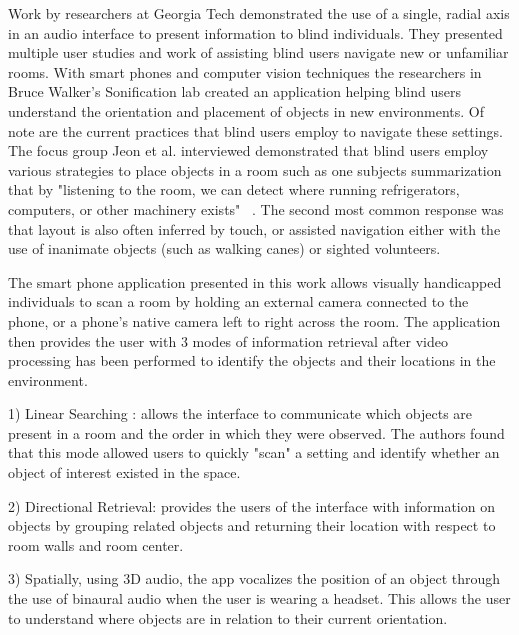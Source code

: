 Work by researchers at Georgia Tech demonstrated the use of a single, radial
axis in an audio interface to present information to blind individuals. They
presented multiple user studies and work of assisting blind users navigate new
or unfamiliar rooms. With smart phones and computer vision techniques the
researchers in Bruce Walker's Sonification lab created an application helping
blind users understand the orientation and placement of objects in new
environments. Of note are the current practices that blind users employ to
navigate these settings. The focus group Jeon et al. interviewed demonstrated
that blind users employ various strategies to place objects in a room such as
one subjects summarization that by "listening to the room, we can detect where
running refrigerators, computers, or other machinery exists"
~\cite{jeon2012listen2droom}. The second most common response was that layout is
also often inferred by touch, or assisted navigation either with the use of
inanimate objects (such as walking canes) or sighted volunteers.

The smart phone application presented in this work allows visually handicapped
individuals to scan a room by holding an external camera connected to the phone,
or a phone's native camera left to right across the room. The application then
provides the user with 3 modes of information retrieval after video processing
has been performed to identify the objects and their locations in the
environment.

1) Linear Searching : allows the interface to communicate which objects are
present in a room and the order in which they were observed. The authors found
that this mode allowed users to quickly "scan" a setting and identify whether an
object of interest existed in the space.

2) Directional Retrieval: provides the users of the interface with information
on objects by grouping related objects and returning their location with respect
to room walls and room center.

3) Spatially, using 3D audio, the app vocalizes the position of an object
through the use of binaural audio when the user is wearing a headset. This
allows the user to understand where objects are in relation to their current
orientation.

